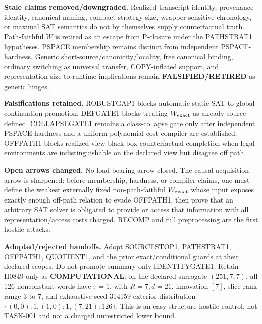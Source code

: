 \documentclass[11pt]{article}
\begin{document}
\textbf{Stale claims removed/downgraded.}
Realized transcript identity, provenance identity, canonical naming, compact strategy size, wrapper-sensitive chronology, or maximal SAT semantics do not by themselves supply counterfactual truth. Path-faithful \(W\) is retired as an escape from P-closure under the PATHSTRAT1 hypotheses. PSPACE membership remains distinct from independent PSPACE-hardness. Generic short-source/canonicity/locality, free canonical binding, ordinary switching as universal transfer, COPY-inflated support, and representation-size-to-runtime implications remain \textbf{FALSIFIED/RETIRED} as generic hinges.

\textbf{Falsifications retained.}
ROBUSTGAP1 blocks automatic static-SAT-to-global-continuation promotion. DEFGATE1 blocks treating \(W_{\rm exact}\) as already source-defined. COLLAPSEGATE1 remains a class-collapse gate only after independent PSPACE-hardness and a uniform polynomial-cost compiler are established. OFFPATH1 blocks realized-view black-box counterfactual completion when legal environments are indistinguishable on the declared view but disagree off path.

\textbf{Open arrows changed.}
No load-bearing arrow closed. The causal acquisition arrow is sharpened: before membership, hardness, or compiler claims, one must define the weakest externally fixed non-path-faithful \(W_{\rm exact}\) whose input exposes exactly enough off-path relation to evade OFFPATH1, then prove that an arbitrary SAT solver is obligated to provide or access that information with all representation/access costs charged. RECOMP and full preprocessing are the first hostile attacks.

\textbf{Adopted/rejected handoffs.}
Adopt SOURCESTOP1, PATHSTRAT1, OFFPATH1, QUOTIENT1, and the prior exact/conditional guards at their declared scopes. Do not promote summary-only IDENTITYGATE1. Retain H0849 only as \textbf{COMPUTATIONAL}: on the declared surrogate \((251,7,7)\), all 126 nonconstant words have \(\tau=1\), with \(R=7,d=21\), innovation \([7]\), slice-rank range \(3\) to \(7\), and exhaustive seed-314159 exterior distribution \(\{(0,0):1,(1,0):1,(7,21):126\}\). This is an easy-structure hostile control, not TASK-001 and not a charged unrestricted lower bound.
\end{document}
